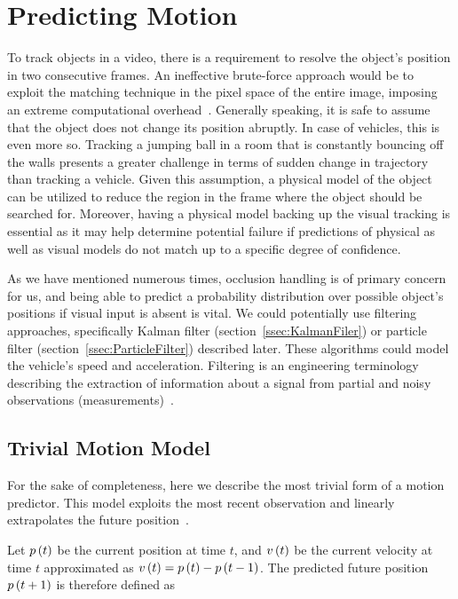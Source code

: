 \section{Predicting Motion}
\label{sec:PredictingMotion}

To track objects in a video, there is a requirement to resolve the object's position in two consecutive frames. An ineffective brute-force approach would be to exploit the matching technique in the pixel space of the entire image, imposing an extreme computational overhead~\cite{Jalal2012}. Generally speaking, it is safe to assume that the object does not change its position abruptly. In case of vehicles, this is even more so. Tracking a jumping ball in a room that is constantly bouncing off the walls presents a greater challenge in terms of sudden change in trajectory than tracking a vehicle. Given this assumption, a physical model of the object can be utilized to reduce the region in the frame where the object should be searched for. Moreover, having a physical model backing up the visual tracking is essential as it may help determine potential failure if predictions of physical as well as visual models do not match up to a specific degree of confidence.

As we have mentioned numerous times, occlusion handling is of primary concern for us, and being able to predict a probability distribution over possible object's positions if visual input is absent is vital. We could potentially use filtering approaches, specifically Kalman filter (section~\ref{ssec:KalmanFiler}) or particle filter (section~\ref{ssec:ParticleFilter}) described later. These algorithms could model the vehicle's speed and acceleration. Filtering is an engineering terminology describing the extraction of information about a signal from partial and noisy observations (measurements)~\cite{Kunsch2013}.

\subsection{Trivial Motion Model}
\label{ssec:TrivialMotionModel}

For the sake of completeness, here we describe the most trivial form of a motion predictor. This model exploits the most recent observation and linearly extrapolates the future position~\cite{broida1986estimation}.

Let ${p} \left( t \right)$ be the current position at time $t$, and ${v} \left( t \right)$ be the current velocity at time $t$ approximated as ${v} \left( t \right) = {p} \left( t \right) - {p} \left( t - 1 \right)$. The predicted future position ${p} \left( t + 1 \right)$ is therefore defined as

